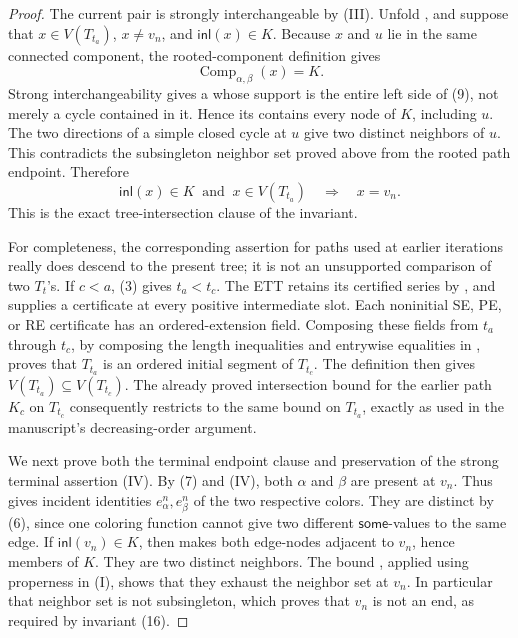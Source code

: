\begin{proof}
The current pair is strongly interchangeable by (III).  Unfold
, and suppose that
\(x\in V(T_{t_a})\), \(x\ne v_n\), and
\(\mathsf{inl}(x)\in K\).  Because \(x\) and \(u\) lie in the same
connected component, the rooted-component definition
 gives
\[
 \operatorname{Comp}_{\alpha,\beta}(x)=K.                    \tag{9}
\]
Strong interchangeability gives a
 whose support is the entire left side
of (9), not merely a cycle contained in it.  Hence its
 contains every node of \(K\), including \(u\).
The two directions of a simple closed cycle at \(u\) give two distinct
neighbors of \(u\).  This contradicts the subsingleton neighbor set
proved above from the rooted path endpoint.  Therefore
\[
 \mathsf{inl}(x)\in K\ \text{ and }\ x\in V(T_{t_a})
       \quad\Longrightarrow\quad x=v_n.                      \tag{10}
\]
This is the exact tree-intersection clause of the invariant.

For completeness, the corresponding assertion for paths used at earlier
iterations really does descend to the present tree; it is not an
unsupported comparison of two \(T_t\)'s.  If \(c<a\), (3) gives
\(t_a<t_c\).  The ETT retains its certified series by
, and  supplies a
 certificate at every positive intermediate
slot.  Each noninitial SE, PE, or RE certificate has an ordered-extension
field.  Composing these fields from \(t_a\) through \(t_c\), by composing
the length inequalities and entrywise equalities in
, proves that \(T_{t_a}\) is an
ordered initial segment of \(T_{t_c}\).  The definition
 then gives
\(V(T_{t_a})\subseteq V(T_{t_c})\).  The already proved intersection
bound for the earlier path \(K_c\) on \(T_{t_c}\) consequently restricts
to the same bound on \(T_{t_a}\), exactly as used in the manuscript's
decreasing-order argument.

We next prove both the terminal endpoint clause and preservation of the
strong terminal assertion (IV).  By (7) and (IV), both \(\alpha\) and
\(\beta\) are present at \(v_n\).  Thus  gives
incident identities \(e_\alpha^n,e_\beta^n\) of the two respective
colors.  They are distinct by (6), since one coloring function cannot
give two different \(\mathsf{some}\)-values to the same edge.  If
\(\mathsf{inl}(v_n)\in K\), then
 makes both edge-nodes adjacent to
\(v_n\), hence members of \(K\).  They are two distinct neighbors.
The bound , applied using
properness in (I), shows that they exhaust the neighbor set at \(v_n\).
In particular that neighbor set is not subsingleton, which proves that
\(v_n\) is not an end, as required by invariant (16).


\end{proof}
